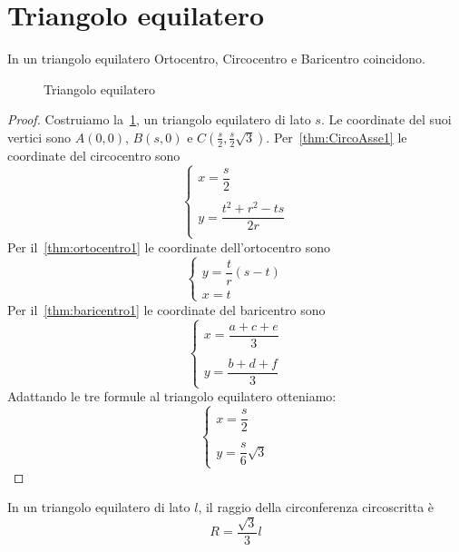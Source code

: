 \section{Triangolo equilatero}\label{sec:triangolo-equilatero}
\begin{thm}\label{thm:triangoloequilatero1}
In un triangolo equilatero Ortocentro, Circocentro e Baricentro coincidono.
\end{thm}
\begin{figure}
	\centering
	
	\caption{Triangolo equilatero}
	\label{fig:triangoloequilatero1}
\end{figure}
\begin{proof}
	Costruiamo la~\cref{fig:triangoloequilatero1}, un triangolo equilatero di lato $s$. Le coordinate del suoi vertici sono $A(0,0)$, $B(s,0)$ e $C(\frac{s}{2},\frac{s}{2}\sqrt{3})$. 
	Per~\cref{thm:CircoAsse1} le coordinate del circocentro sono
	\[\begin{cases}
	x=\dfrac{s}{2}\\ \\
	y=\dfrac{t^2+r^2-ts}{2r}\\
	\end{cases}\]
	Per il~\cref{thm:ortocentro1} le coordinate dell'ortocentro sono \[\begin{cases}
	y=\dfrac{t}{r}(s-t)\\
	x=t
	\end{cases}\] 
	Per il~\cref{thm:baricentro1} le coordinate del baricentro sono \[\begin{cases}
	x=\dfrac{a+c+e}{3}\\ \\
	y=\dfrac{b+d+f}{3}
	\end{cases} \]
	Adattando le tre formule al triangolo equilatero otteniamo:
	\[\begin{cases}
	x=\dfrac{s}{2}\\ \\
	y=\dfrac{s}{6}\sqrt{3}
	\end{cases}\]
\end{proof}
\begin{thm}\label{thm:raggiocirconferenzacircoscritta}
	In un triangolo equilatero di lato $l$, il raggio della circonferenza circoscritta è \[R=\dfrac{\sqrt{3}}{3}l\]
\end{thm}
